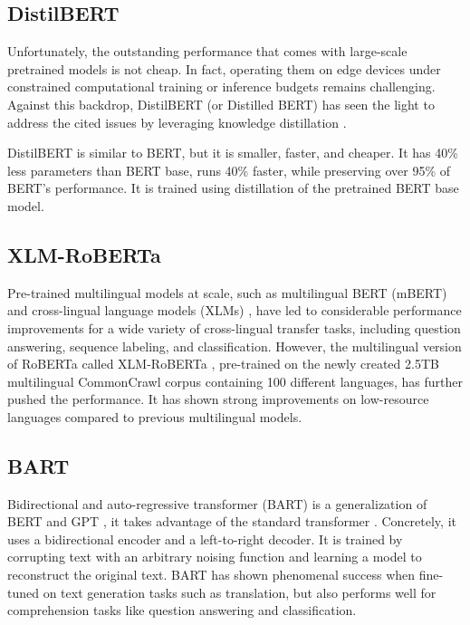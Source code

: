 \documentclass{article}
\begin{document}
\subsection{DistilBERT}
Unfortunately, the outstanding performance that comes with large-scale pretrained models is not cheap. In fact, operating them on edge devices under constrained computational training or inference budgets remains challenging. Against this backdrop, DistilBERT \cite{sanh2019distilbert} (or Distilled BERT) has seen the light to address the cited issues by leveraging knowledge distillation \cite{hinton2015distilling}.

DistilBERT is similar to BERT, but it is smaller, faster, and cheaper. It has 40\% less parameters than BERT base, runs 40\% faster, while preserving over 95\% of BERT's performance. It is trained using distillation of the pretrained BERT base model.

\subsection{XLM-RoBERTa}
Pre-trained multilingual models at scale, such as multilingual BERT (mBERT) \cite{devlin2018bert}  and cross-lingual language models (XLMs) \cite{lample2019cross}, have led to considerable performance improvements for a wide variety of cross-lingual transfer tasks, including question answering, sequence labeling, and classification. However, the multilingual version of RoBERTa \cite{liu2019roberta}  called XLM-RoBERTa \cite{conneau2019unsupervised}, pre-trained on the newly created 2.5TB multilingual CommonCrawl corpus containing 100 different languages, has further pushed the performance. It has shown strong improvements on low-resource languages compared to previous multilingual models.

\subsection{BART}
Bidirectional and auto-regressive transformer (BART) \cite{lewis2019bart} is a generalization of BERT \cite{devlin2018bert} and GPT \cite{radford2018improving}, it takes advantage of the standard transformer \cite{vaswani2017attention}. Concretely, it uses a bidirectional encoder and a left-to-right decoder. It is trained by corrupting text with an arbitrary noising function and learning a model to reconstruct the original text. BART has shown phenomenal success when fine-tuned on text generation tasks such as translation, but also performs well for comprehension tasks like question answering and classification.
\end{document}
